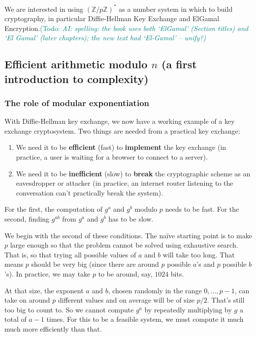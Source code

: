 \documentclass{article}
\theoremstyle{plain}
\theoremstyle{definition}
\theoremstyle{remark}
\numberwithin{theorem}{section}
\newcommand{\todo}[1]{\textcolor{teal}{{\sf (Todo:} {\sl{#1})}}}
\newcommand{\todo}[1]{}
\newcommand{\ZZ}{\mathbb{Z}}
\begin{document}
We are interested in using $(\ZZ/p\ZZ)^*$ as a number system in which to build cryptography, in particular Diffie-Hellman Key Exchange and ElGamal Encryption.\todo{AI: spelling: the book uses both `ElGamal' (Section titles) and `El Gamal' (later chapters); the new text had `El-Gamal' -- unify?}
     
\subsection{Efficient arithmetic modulo $n$ (a first introduction to complexity)}

\subsubsection{The role of modular exponentiation}

With Diffie-Hellman key exchange, we now have a working example of a key exchange cryptosystem.  Two things are needed from a practical key exchange:

\begin{enumerate}
    \item We need it to be \textbf{efficient} (fast) to \textbf{implement} the key exchange (in practice, a user is waiting for a browser to connect to a server).
    \item We need it to be \textbf{inefficient} (slow) to \textbf{break} the cryptographic scheme as an eavesdropper or attacker (in practice, an internet router listening to the conversation can't practically break the system).
\end{enumerate}

For the first, the computation of $g^a$ and $g^b$ modulo $p$ needs to be fast.  For the second, finding $g^{ab}$ from $g^a$ and $g^b$ has to be slow.  

We begin with the second of these conditions.  The na\"ive starting point is to make $p$ large enough so that the problem cannot be solved using exhaustive search.  That is, so that trying all possible values of $a$ and $b$ will take too long.  That means $p$ should be very big (since there are around $p$ possible $a$'s and $p$ possible $b$'s).  In practice, we may take $p$ to be around, say, $1024$ bits.

At that size, the exponent $a$ and $b$, chosen randomly in the range $0, \ldots, p-1$, can take on around $p$ different values and on average will be of size $p/2$.  That's still too big to count to.  So we cannot compute $g^a$ by repeatedly multiplying by $g$ a total of $a-1$ times.  For this to be a feasible system, we must compute it much much more efficiently than that.
\end{document}
